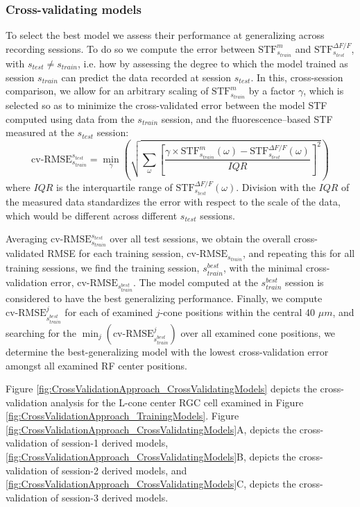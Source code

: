 \documentclass[11pt, oneside]{article}   	%
\begin{document}
\subsubsection{Cross-validating models}
To select the best model we assess their performance at generalizing across recording sessions. To do so we compute the error between $\mbox{STF}^{m}_{s_{train}}$ and $\mbox{STF}^{\Delta F / F}_{s_{test}}$, with $s_{test} \ne  s_{train}$, i.e. how by assessing the degree to which the model trained as session $s_{train}$ can predict the data recorded at session $s_{test}$. 
In this, cross-session comparison, we allow for an arbitrary scaling of $\mbox{STF}^{m}_{s_{train}}$ by a factor $\gamma$, which is selected so as to minimize the cross-validated error between the model STF computed using data from the $s_{train}$ session, and the fluorescence--based STF measured at the $s_{test}$ session: 
%
\begin{equation}
\mbox{cv-RMSE}^{s_{test}}_{s_{train}} = \min_{\gamma} \left( \sqrt{\sum_{\omega} \left [  \frac{\gamma \times \mbox{STF}^{m}_{s_{train}}(\omega) - \mbox{STF}^{\Delta F / F}_{s_{test}}(\omega)}{IQR} \right ] ^2 }\right)
\end{equation}
%
\noindent
where $IQR$ is the interquartile range of $\mbox{STF}^{\Delta F / F}_{s_{test}}(\omega)$. Division with the $IQR$ of the measured data standardizes the error with respect to the scale of the data, which would be different across different $s_{test}$ sessions.

Averaging $\mbox{cv-RMSE}^{s_{test}}_{s_{train}}$ over all test sessions, we obtain the overall cross-validated RMSE for each training session, $\mbox{cv-RMSE}_{s_{train}}$, and repeating this for all training sessions, we find the training session, $s_{train}^{best}$, with the minimal cross-validation error, $\mbox{cv-RMSE}_{s_{train}^{best}}$. The model computed at the $s_{train}^{best}$ session is considered to have the best generalizing performance. Finally, we compute $\mbox{cv-RMSE}^j_{s_{train}^{best}}$ for each of examined $j$-cone positions within the central 40 $\mu m$, and searching for the $\displaystyle \min_{j} \left( \mbox{cv-RMSE}^j_{s_{train}^{best}} \right) $ over all examined cone positions, we determine the best-generalizing model with the lowest cross-validation error amongst all examined RF center positions.

Figure \ref{fig:CrossValidationApproach_CrossValidatingModels} depicts the cross-validation analysis for the L-cone center RGC cell examined in Figure \ref{fig:CrossValidationApproach_TrainingModels}. Figure \ref{fig:CrossValidationApproach_CrossValidatingModels}A, depicts the cross-validation of session-1 derived models, \ref{fig:CrossValidationApproach_CrossValidatingModels}B, depicts the cross-validation of session-2 derived models, and \ref{fig:CrossValidationApproach_CrossValidatingModels}C, depicts the cross-validation of session-3 derived models. 
\end{document}
